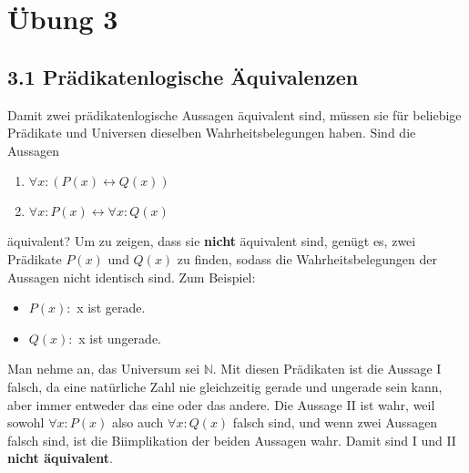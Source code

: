 \documentclass[12pt,a4paper]{article}
\begin{document}
\section*{Übung 3}
\subsection*{3.1 Prädikatenlogische Äquivalenzen}
Damit zwei prädikatenlogische Aussagen äquivalent sind, müssen sie für beliebige Prädikate und Universen dieselben Wahrheitsbelegungen haben. Sind die Aussagen
\begin{enumerate}[I]
\item $\forall x : (P(x) \leftrightarrow Q(x))$
\item $\forall x : P(x) \leftrightarrow \forall x : Q (x)$
\end{enumerate}
äquivalent? Um zu zeigen, dass sie \textbf{nicht} äquivalent sind, genügt es, zwei Prädikate $P(x)$ und $Q(x)$ zu finden, sodass die Wahrheitsbelegungen der Aussagen nicht identisch sind. Zum Beispiel:
\begin{itemize}
\item $P(x):$ x ist gerade.
\item $Q(x):$ x ist ungerade.

\end{itemize}
Man nehme an, das Universum sei $\mathbb{N}$. Mit diesen Prädikaten ist die Aussage I falsch, da eine natürliche Zahl nie gleichzeitig gerade und ungerade sein kann, aber immer entweder das eine oder das andere. Die Aussage II ist wahr, weil sowohl $\forall x: P(x)$ also auch $\forall x: Q(x)$ falsch sind, und wenn zwei Aussagen falsch sind, ist die Biimplikation der beiden Aussagen wahr. Damit sind I und II \textbf{nicht äquivalent}.
\end{document}
